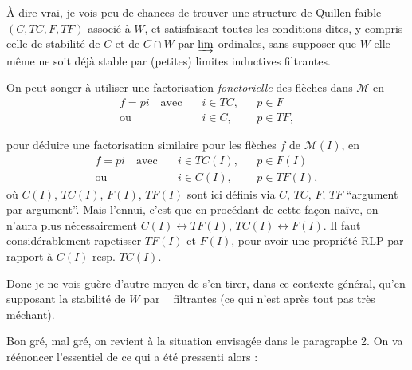 \documentclass[11pt]{article}
\newcommand{\printedpage}[1]{\marginpar{\footnotesize p.~#1}}
\newcommand{\msp}[1]{\marginpar{\footnotesize [#1]}}
\newcommand{\M}{\mathcal{M}}
\newcommand{\cM}{\mathcal{M}}
\newcommand{\limind}{\mathop{\underrightarrow{\mathrm{lim}}}}
\begin{document}
À dire vrai, je vois peu de chances de trouver une structure de Quillen faible $(C,TC,F,TF)$ associé à $W$, et satisfaisant toutes les conditions dites, y compris celle de stabilité de $C$ et de $C\cap W$ par $\varinjlim$ ordinales, sans supposer que $W$ elle-même ne soit déjà stable par (petites) limites inductives filtrantes. %

\msp{page 41}
On peut songer à utiliser une factorisation \textit{fonctorielle} des flèches dans $\cM$ en
\[
\begin{aligned}
f = pi \quad \text{avec}\quad & i\in TC, && p\in F\\
\text{ou}\quad & i\in C, && p\in TF,
\end{aligned}
\]

\printedpage{24}
pour déduire une factorisation similaire pour les flèches $f$ de $\M(I)$, en
\[
\begin{aligned}
f = pi \quad \text{avec}\quad & i \in TC(I), && p \in F(I)\\
\text{ou}\quad & i \in C(I), && p \in TF(I),
\end{aligned}
\]
où $C(I)$, $TC(I)$, $F(I)$, $TF(I)$ sont ici définis via $C$, $TC$, $F$, $TF$ “argument par argument”. Mais l'ennui, c'est que en procédant de cette façon naïve, on n'aura plus nécessairement $C(I) \longleftrightarrow TF(I)$, $TC(I) \longleftrightarrow F(I)$. Il faut considérablement rapetisser $TF(I)$ et $F(I)$, pour avoir une propriété RLP par rapport à $C(I)$ resp. $TC(I)$.

Donc je ne vois guère d'autre moyen de s'en tirer, dans ce contexte général, qu'en supposant la stabilité de $W$ par $\limind$ filtrantes (ce qui n'est après tout pas très méchant).

\noindent\msp{page 42}

Bon gré, mal gré, on revient à la situation envisagée dans le paragraphe 2. On va réénoncer l'essentiel de ce qui a été pressenti alors :
\end{document}
